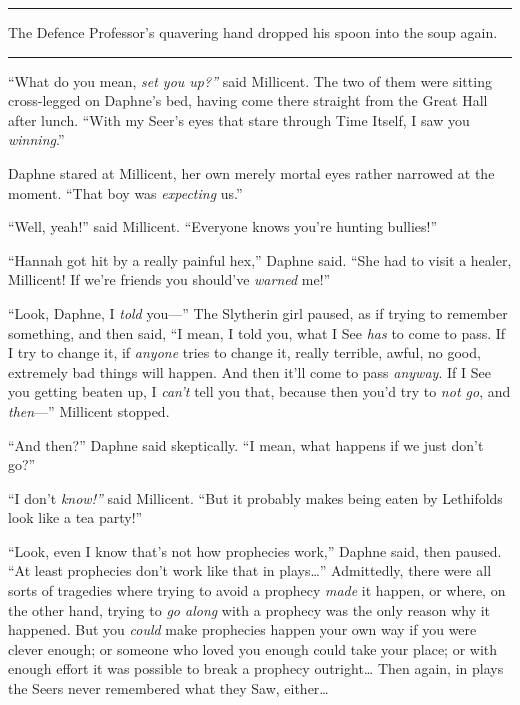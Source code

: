 \begin{center}\rule{3in}{0.4pt}\end{center}

The Defence Professor's quavering hand dropped his spoon into the soup
again.

\begin{center}\rule{3in}{0.4pt}\end{center}

``What do you mean, \emph{set you up?''} said Millicent. The two of them
were sitting cross-legged on Daphne's bed, having come there straight
from the Great Hall after lunch. ``With my Seer's eyes that stare
through Time Itself, I saw you \emph{winning}.''

Daphne stared at Millicent, her own merely mortal eyes rather narrowed
at the moment. ``That boy was \emph{expecting} us.''

``Well, yeah!'' said Millicent. ``Everyone knows you're hunting
bullies!''

``Hannah got hit by a really painful hex,'' Daphne said. ``She had to
visit a healer, Millicent! If we're friends you should've \emph{warned}
me!''

``Look, Daphne, I \emph{told} you---'' The Slytherin girl paused, as if
trying to remember something, and then said, ``I mean, I told you, what
I See \emph{has} to come to pass. If I try to change it, if
\emph{anyone} tries to change it, really terrible, awful, no good,
extremely bad things will happen. And then it'll come to pass
\emph{anyway}. If I See you getting beaten up, I \emph{can't} tell you
that, because then you'd try to \emph{not go}, and \emph{then}---''
Millicent stopped.

``And then?'' Daphne said skeptically. ``I mean, what happens if we just
don't go?''

``I don't \emph{know!''} said Millicent. ``But it probably makes being
eaten by Lethifolds look like a tea party!''

``Look, even I know that's not how prophecies work,'' Daphne said, then
paused. ``At least prophecies don't work like that in plays\ldots{}''
Admittedly, there were all sorts of tragedies where trying to avoid a
prophecy \emph{made} it happen, or where, on the other hand, trying to
\emph{go along} with a prophecy was the only reason why it happened. But
you \emph{could} make prophecies happen your own way if you were clever
enough; or someone who loved you enough could take your place; or with
enough effort it was possible to break a prophecy outright\ldots{} Then
again, in plays the Seers never remembered what they Saw, either\ldots{}

